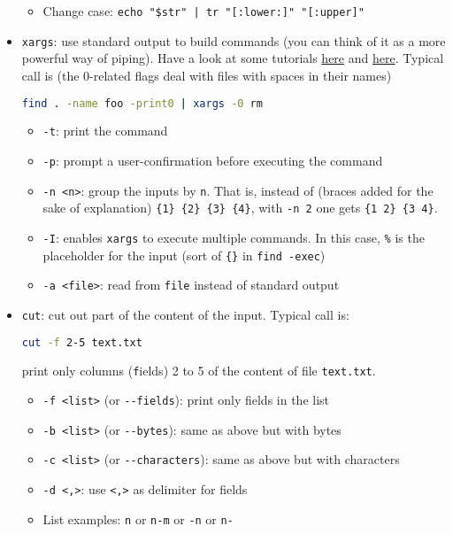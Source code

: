 \documentclass[a4paper,12pt,%
              final%
              ]{article}
\begin{document}
\begin{itemize}
\begin{itemize}
      \item Change case: \verb!echo "$str" | tr "[:lower:]" "[:upper]"!
    \end{itemize}
  \item \texttt{xargs}: use standard output to build commands (you can think of it as a more powerful way of piping). Have a look at some tutorials \href{https://shapeshed.com/unix-xargs/}{here} and \href{https://www.thegeekstuff.com/2013/12/xargs-examples/}{here}. Typical call is (the 0-related flags deal with files with spaces in their names)
\begin{lstlisting}[language=bash]
find . -name foo -print0 | xargs -0 rm
\end{lstlisting}
    \begin{itemize}
      \item \texttt{-t}: print the command
      \item \texttt{-p}: prompt a user-confirmation before executing the command
      \item \texttt{-n <n>}: group the inputs by \texttt{n}. That is, instead of (braces added for the sake of explanation) \verb|{1} {2} {3} {4}|, with \texttt{-n 2} one gets \verb|{1 2} {3 4}|.
      \item \texttt{-I}: enables \texttt{xargs} to execute multiple commands. In this case, \verb|%| is the placeholder for the input (sort of \verb|{}| in \verb|find -exec|)
      \item \texttt{-a <file>}: read from \texttt{file} instead of standard output
    \end{itemize}
  \item \texttt{cut}: cut out part of the content of the input. Typical call is:
\begin{lstlisting}[language=bash]
cut -f 2-5 text.txt
\end{lstlisting}
    print only columns (\texttt{f}ields) 2 to 5 of the content of file \verb|text.txt|.
    \begin{itemize}
      \item \verb|-f <list>| (or \verb|--fields|): print only fields in the list
      \item \verb|-b <list>| (or \verb|--bytes|): same as above but with bytes
      \item \verb|-c <list>| (or \verb|--characters|): same as above but with characters
      \item \verb|-d <,>|: use \verb|<,>| as delimiter for fields
      \item List examples: \texttt{n} or \texttt{n-m} or \texttt{-n} or \texttt{n-}

\end{itemize}
\end{itemize}
\end{document}
